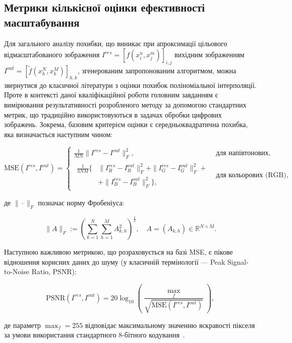 \subsection{Метрики кількісної оцінки ефективності масштабування}
Для загального аналізу похибки, що виникає при апроксимації цільового відмасштабованого зображення $I^{res} = [f(x_i^n, x_j^m)]_{i,j}$ вихідним зображенням $I^{out} = [\tilde{f}(x_h^N, x_k^M)]_{h,k}$, згенерованим запропонованим алгоритмом, можна звернутися до класичної літератури з оцінки похибок поліноміальної інтерполяції. Проте в контексті даної кваліфікаційної роботи головним завданням є вимірювання результативності розробленого методу за допомогою стандартних метрик, що традиційно використовуються в задачах обробки цифрових зображень. Зокрема, базовим критерієм оцінки є середньоквадратична похибка, яка визначається наступним чином:

\begin{equation*}
	\text{MSE}(I^{res}, I^{out}) = 
	\begin{cases} 
		\frac{1}{MN} \|I^{res} - I^{out}\|_F^2, & \text{для напівтонових}, \\[10pt]
		\begin{aligned}
			\frac{1}{3NM} \Big\{ &\|I_R^{res} - I_R^{out}\|_F^2 + \|I_G^{res} - I_G^{out}\|_F^2 + \\
			& + \|I_B^{res} - I_B^{out}\|_F^2 \Big\},
		\end{aligned} & \text{для кольорових (RGB)}, 
	\end{cases}
\end{equation*}

де $\|\cdot\|_F$ позначає норму Фробеніуса:

\begin{equation*}
	\|A\|_F := \left( \sum_{k=1}^N \sum_{h=1}^M A_{k,h}^2 \right)^{\frac{1}{2}}, \quad A = (A_{k,h}) \in \mathbb{R}^{N \times M}.
\end{equation*}

Наступною важливою метрикою, що розраховується на базі MSE, є пікове відношення корисних даних до шуму (у класичній термінології --- Peak Signal-to-Noise Ratio, PSNR):

\begin{equation}\tag{25}
	\text{PSNR}(I^{res}, I^{out}) = 20 \log_{10} \left( \frac{\max_f}{\sqrt{\text{MSE}(I^{res}, I^{out})}} \right),
\end{equation}

де параметр $\max_f = 255$ відповідає максимальному значенню яскравості пікселя за умови використання стандартного 8-бітного кодування~\cite{occorsio2022lagrange}.

